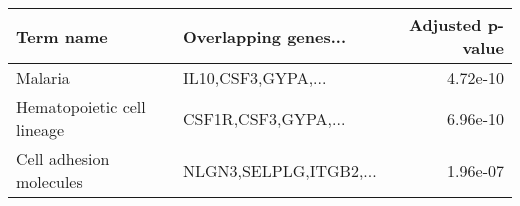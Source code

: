 \begin{tabular}{llr}
\toprule
                 Term name &   Overlapping genes... &  Adjusted p-value \\
\midrule
                   Malaria &     IL10,CSF3,GYPA,... &          4.72e-10 \\
Hematopoietic cell lineage &    CSF1R,CSF3,GYPA,... &          6.96e-10 \\
   Cell adhesion molecules & NLGN3,SELPLG,ITGB2,... &          1.96e-07 \\
\bottomrule
\end{tabular}
